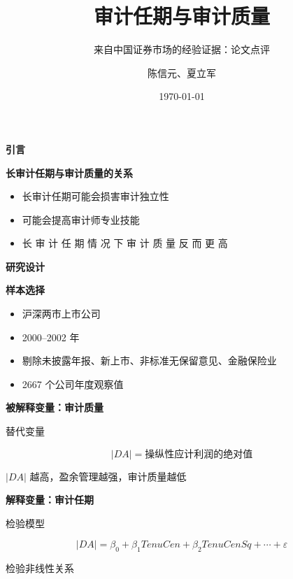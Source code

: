 \documentclass[aspectratio=169,UTF8,zihao=-4]{ctexbeamer}
\title{审计任期与审计质量}
\subtitle{来自中国证券市场的经验证据：论文点评}
\author{陈信元、夏立军}
\date{\today}
\newcommand{\bigidea}[1]{
  \begin{center}
    \vspace{0.8em}
    {\LARGE \bfseries #1}
    \vspace{0.6em}
  \end{center}
}
\newcommand{\sectionpageframe}[1]{
  \begin{frame}[plain]
    \begin{center}
      \vfill
      {\Huge \bfseries #1}
      \vfill
    \end{center}
  \end{frame}
}
\begin{document}
\begin{frame}[plain]
  \titlepage
\end{frame}

\sectionpageframe{引言}
 
\begin{frame}
  \bigidea{长审计任期与审计质量的关系}
  \begin{itemize}
    \item \Large 长审计任期可能会损害审计独立性
    \item \Large 可能会提高审计师专业技能
    \item \Large 长 审 计 任 期 情 况 下 审 计 质 量 反 而 更 高
  \end{itemize}
\end{frame}

\sectionpageframe{研究设计}

\begin{frame}
  \bigidea{样本选择}
  \begin{itemize}
    \item \Large 沪深两市上市公司
    \item \Large 2000--2002 年
    \item \Large 剔除未披露年报、新上市、非标准无保留意见、金融保险业
    \item \Large 2667 个公司年度观察值
  \end{itemize}
\end{frame}

\begin{frame}
  \bigidea{被解释变量：审计质量}
  \begin{block}{替代变量}
  \begin{center}
    {\Large
    \[
      |DA|=\text{操纵性应计利润的绝对值}
    \]
    }
  \end{center}
  \end{block}
  \begin{center}
    \Large $|DA|$ 越高，盈余管理越强，审计质量越低
  \end{center}
\end{frame}

\begin{frame}
  \bigidea{解释变量：审计任期}
  \begin{block}{检验模型}
  \begin{center}
    {\Large
    \[
      |DA|=\beta_0+\beta_1TenuCen+\beta_2TenuCenSq+\cdots+\varepsilon
    \]
    }
  \end{center}
  \end{block}
  \begin{center}
    \Large 检验非线性关系 
  \end{center}
\end{frame}
\end{document}
